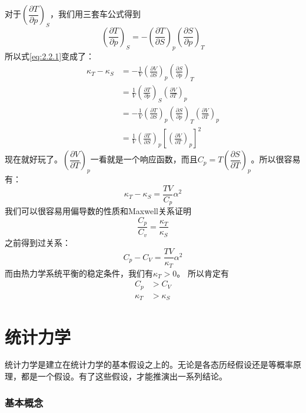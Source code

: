 \documentclass[UTF8]{ctexart}
\numberwithin{equation}{subsection}
\begin{document}
对于$\left(\dfrac{\partial T}{\partial p}\right)_{S}$，我们用三套车公式得到
\[ \left(\frac{\partial T}{\partial p}\right)_{S}=-\left(\frac{\partial T}{\partial S}\right)_{p}\left(\frac{\partial S}{\partial p}\right)_{T} \]
所以式\ref{eq:2.2.1}变成了：
\begin{align*}
\kappa_T-\kappa_S&=-\frac{1}{V}\left(\frac{\partial V}{\partial S}\right)_{p}\left(\frac{\partial S}{\partial p}\right)_{T}\\
&=\frac{1}{V}\left(\frac{\partial T}{\partial p}\right)_{S}\left(\frac{\partial V}{\partial T}\right)_{p}\\
&=-\frac{1}{V}\left(\frac{\partial T}{\partial S}\right)_{p}\left(\frac{\partial S}{\partial p}\right)_{T}\left(\frac{\partial V}{\partial T}\right)_{p}\\
&=\frac{1}{V}\left(\frac{\partial T}{\partial S}\right)_{p}\left[\left(\frac{\partial V}{\partial T}\right)_{p}\right]^2
\end{align*}
现在就好玩了。$\left(\dfrac{\partial V}{\partial T}\right)_{p}$一看就是一个响应函数，而且$C_p=T\left(\dfrac{\partial S}{\partial T}\right)_{p}$。所以很容易有：
\[ \kappa_T-\kappa_S=\frac{TV}{C_p}\alpha^2 \]
我们可以很容易用偏导数的性质和Maxwell关系证明
\[ \frac{C_p}{C_v}=\frac{\kappa_T}{\kappa_S} \]
之前得到过关系：
\[ C_p-C_V=\frac{TV}{\kappa_T}\alpha^2 \]
而由热力学系统平衡的稳定条件，我们有$\kappa_T>0$。
所以肯定有
\begin{align*}
C_p&>C_V\\
\kappa_T&>\kappa_S
\end{align*}


\part{统计力学}
统计力学是建立在统计力学的基本假设之上的。无论是各态历经假设还是等概率原理，都是一个假设。有了这些假设，才能推演出一系列结论。
\section{基本概念}



\end{document}
